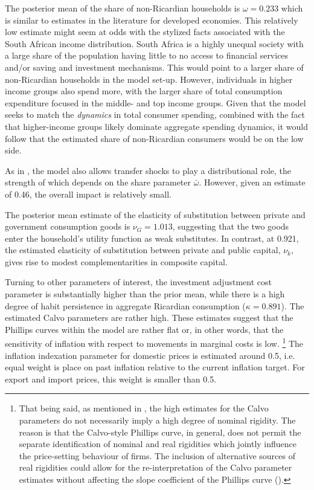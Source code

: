 \documentclass[a4paper,11pt]{article}
\numberwithin{equation}{section}
\begin{document}
	The posterior mean of the share of non-Ricardian households is $\omega=0.233$ which is similar to estimates in the literature for developed economies. This relatively low estimate might seem at odds with the stylized facts associated with the South African income distribution. South Africa is a highly unequal society with a large share of the population having little to no access to financial services and/or saving and investment mechanisms. This would point to a larger share of non-Ricardian households in the model set-up. However, individuals in higher income groups also spend more, with the larger share of total consumption expenditure focused in the middle- and top income groups. Given that the model seeks to match the \textit{dynamics} in total consumer spending, combined with the fact that higher-income groups likely dominate aggregate spending dynamics, it would follow that the estimated share of non-Ricardian consumers would be on the low side.
	
	As in \cite{coenen2013}, the model also allows transfer shocks to play a distributional role, the strength of which depends on the share parameter $\bar{\omega}$. However, given an estimate of 0.46, the overall impact is relatively small.
	
	The posterior mean estimate of the elasticity of substitution between private and government consumption goods is $\nu_G = 1.013$, suggesting that the two goods enter the household's utility function as weak substitutes. In contrast, at 0.921, the estimated elasticity of substitution between private and public capital, $\nu_k$, gives rise to modest complementarities in composite capital.    
	
	Turning to other parameters of interest, the investment adjustment cost parameter is substantially higher than the prior mean, while there is a high degree of habit persistence in aggregate Ricardian consumption ($\kappa=0.891$). The estimated Calvo parameters are rather high. These estimates suggest that the Phillips curves within the model are rather flat or, in other words, that the sensitivity of inflation with respect to movements in marginal costs is low. \footnote{That being said, as mentioned in \cite{christoffel2008}, the high estimates for the Calvo parameters do not necessarily imply a high degree of nominal rigidity. The reason is that	the Calvo-style Phillips curve, in general, does not permit the separate identification of nominal and real rigidities which jointly influence the price-setting behaviour of firms. The inclusion of alternative sources of real rigidities could allow for the re-interpretation of the Calvo parameter estimates without affecting the slope coefficient of the Phillips curve (\citealp{christoffel2008}).} The inflation indexation parameter for domestic prices is estimated around 0.5, i.e. equal weight is place on past inflation relative to the current inflation target. For export and import prices, this weight is smaller than 0.5.
	
\end{document}
